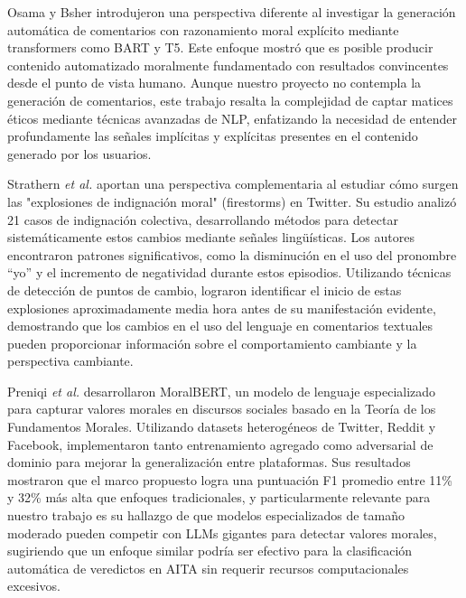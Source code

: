 Osama y Bsher \cite{osama2023} introdujeron una perspectiva diferente al investigar la generación automática de comentarios con razonamiento moral explícito mediante transformers como BART y T5. Este enfoque mostró que es posible producir contenido automatizado moralmente fundamentado con resultados convincentes desde el punto de vista humano. Aunque nuestro proyecto no contempla la generación de comentarios, este trabajo resalta la complejidad de captar matices éticos mediante técnicas avanzadas de NLP, enfatizando la necesidad de entender profundamente las señales implícitas y explícitas presentes en el contenido generado por los usuarios.

Strathern \textit{et al.} \cite{strathern2020} aportan una perspectiva complementaria al estudiar cómo surgen las "explosiones de indignación moral" (firestorms) en Twitter. Su estudio analizó 21 casos de indignación colectiva, desarrollando métodos para detectar sistemáticamente estos cambios mediante señales lingüísticas. Los autores encontraron patrones significativos, como la disminución en el uso del pronombre ``yo'' y el incremento de negatividad durante estos episodios. Utilizando técnicas de detección de puntos de cambio, lograron identificar el inicio de estas explosiones aproximadamente media hora antes de su manifestación evidente, demostrando que los cambios en el uso del lenguaje en comentarios textuales pueden proporcionar información sobre el comportamiento cambiante y la perspectiva cambiante.

Preniqi \textit{et al.} \cite{preniqi2024} desarrollaron MoralBERT, un modelo de lenguaje especializado para capturar valores morales en discursos sociales basado en la Teoría de los Fundamentos Morales. Utilizando datasets heterogéneos de Twitter, Reddit y Facebook, implementaron tanto entrenamiento agregado como adversarial de dominio para mejorar la generalización entre plataformas. Sus resultados mostraron que el marco propuesto logra una puntuación F1 promedio entre 11\% y 32\% más alta que enfoques tradicionales, y particularmente relevante para nuestro trabajo es su hallazgo de que modelos especializados de tamaño moderado pueden competir con LLMs gigantes para detectar valores morales, sugiriendo que un enfoque similar podría ser efectivo para la clasificación automática de veredictos en AITA sin requerir recursos computacionales excesivos.
